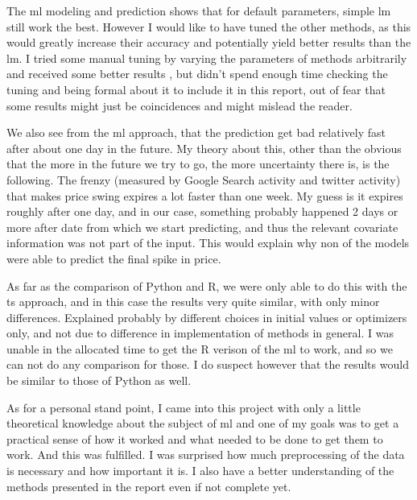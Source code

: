 \documentclass[10pt]{report}
\begin{document}
The \acrlong{ml} modeling and prediction shows that for default parameters, simple \acrlong{lm} still work the best. However I would like to have tuned the other methods, as this would greatly increase their accuracy and potentially yield better results than the \acrlong{lm}. I tried some manual tuning by varying the parameters of methods arbitrarily  and received some better results , but didn't spend enough time checking the tuning and being formal about it to include it in this report, out of fear that some results might just be coincidences and might mislead the reader.

We also see from the \acrlong{ml} approach, that the prediction get bad relatively fast after about one day in the future. 
My theory about this, other than the obvious that the more in the future we try to go, the more uncertainty there is, is the following. The frenzy (measured by Google Search activity and twitter activity) that makes price swing expires a lot faster than one week. My guess is it expires roughly after one day, and in our case, something probably happened 2 days or more after date from which we start predicting, and thus the relevant covariate information was not part of the input. This would explain why non of the models were able to predict the final spike in price.

As far as the comparison of Python and R, we were only able to do this with the \acrlong{ts} approach, and in this case the results very quite similar, with only minor differences. Explained probably by different choices in initial values or optimizers only, and not due to difference in implementation of methods in general. I was unable in the allocated time to get the R verison of the \acrlong{ml} to work, and so we can not do any comparison for those. I do suspect however that the results would be similar to those of Python as well.

As for a personal stand point, I came into this project with only a  little theoretical knowledge about the subject of \acrlong{ml} and one of my goals was to get a practical sense of how it worked and what needed to be done to get them to work. And this was fulfilled. I was surprised how much preprocessing of the data is necessary and how important it is. I also have a better understanding of the methods presented in the report even if not complete yet.
\end{document}
